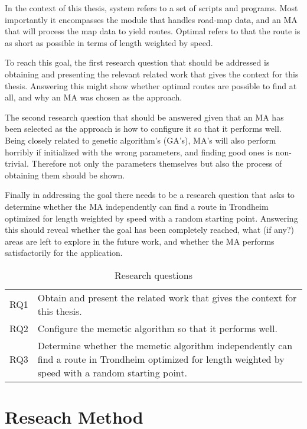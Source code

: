 In the context of this thesis, system refers to a set of scripts and programs. Most importantly it encompasses the module that handles road-map data, and an MA that will process the map data to yield routes. Optimal refers to that the route is as short as possible in terms of length weighted by speed.

To reach this goal, the first research question that should be addressed is obtaining and presenting the relevant related work that gives the context for this thesis. Answering this might show whether optimal routes are possible to find at all, and why an MA was chosen as the approach.

The second research question that should be answered given that an MA has been selected as the approach is how to configure it so that it performs well. Being closely related to genetic algorithm's (GA's), MA's will also perform horribly if initialized with the wrong parameters, and finding good ones is non-trivial. Therefore not only the parameters themselves but also the process of obtaining them should be shown.

Finally in addressing the goal there needs to be a research question that asks to determine whether the MA independently can find a route in Trondheim optimized for length weighted by speed with a random starting point. Answering this should reveal whether the goal has been completely reached, what (if any?) areas are left to explore in the future work, and whether the MA performs satisfactorily for the application.

\begin{table}[H]
\centering
\begin{tabular}{cp{}}
RQ1  &  Obtain and present the related work that gives the context for this thesis. \\
RQ2  &  Configure the memetic algorithm so that it performs well.\\
RQ3  &  Determine whether the memetic algorithm independently can find a route in Trondheim optimized for length weighted by speed with a random starting point. \\
\end{tabular}
\caption{Research questions}
\label{tab:research_questions}
\end{table}

\section{Reseach Method}

